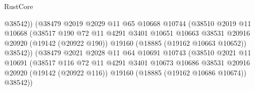 \begin{lexlean}{RustCore}
\begin{coremodule}
                                        @38542))
                                    (@38479
                                      @2019
                                      @2029
                                      @11
                                      @65
                                      @10668
                                      @10744
                                      (@38510
                                        @2019
                                        @11
                                        @10668
                                        (@38517
                                          @190
                                          @72
                                          @11
                                          @4291
                                          @3401
                                          @10651
                                          @10663
                                          @38531
                                          @20916
                                          @20920
                                          (@19142 (@20922 @190))
                                          @19160
                                          (@18885 (@19162 @10663 @10652))
                                          @38542))
                                      (@38479
                                        @2021
                                        @2028
                                        @11
                                        @64
                                        @10691
                                        @10743
                                        (@38510
                                          @2021
                                          @11
                                          @10691
                                          (@38517
                                            @116
                                            @72
                                            @11
                                            @4291
                                            @3401
                                            @10673
                                            @10686
                                            @38531
                                            @20916
                                            @20920
                                            (@19142 (@20922 @116))
                                            @19160
                                            (@18885 (@19162 @10686 @10674))
                                            @38542))

\end{coremodule}
\end{lexlean}
